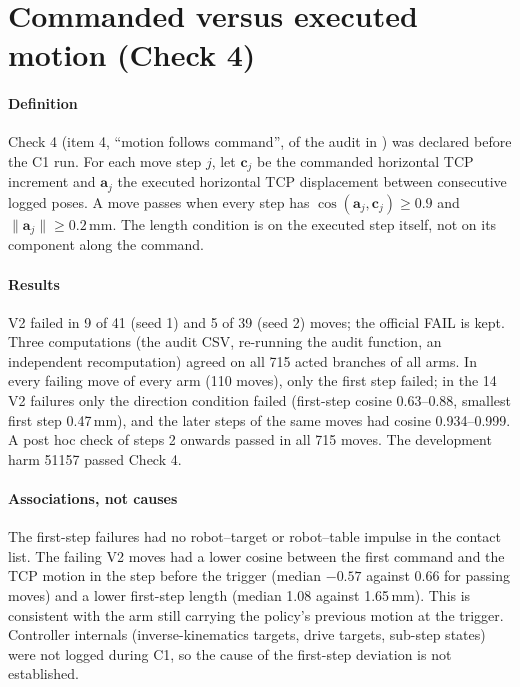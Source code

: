 \section{Commanded versus executed motion (Check 4)}\label{sec:s-check4}

\paragraph{Definition} Check 4 (item 4, ``motion follows command'', of the audit in ) was declared before the C1 run. For each move step $j$, let $\mathbf{c}_j$ be the commanded horizontal TCP increment and $\mathbf{a}_j$ the executed horizontal TCP displacement between consecutive logged poses. A move passes when every step has $\cos(\mathbf{a}_j,\mathbf{c}_j)\ge0.9$ and $\|\mathbf{a}_j\|\ge0.2$\,mm. The length condition is on the executed step itself, not on its component along the command.

\paragraph{Results} V2 failed in 9 of 41 (seed 1) and 5 of 39 (seed 2) moves; the official FAIL is kept. Three computations (the audit CSV, re-running the audit function, an independent recomputation) agreed on all 715 acted branches of all arms. In every failing move of every arm (110 moves), only the first step failed; in the 14 V2 failures only the direction condition failed (first-step cosine 0.63--0.88, smallest first step 0.47\,mm), and the later steps of the same moves had cosine 0.934--0.999. A post hoc check of steps 2 onwards passed in all 715 moves. The development harm 51157 passed Check 4.

\paragraph{Associations, not causes} The first-step failures had no robot--target or robot--table impulse in the contact list. The failing V2 moves had a lower cosine between the first command and the TCP motion in the step before the trigger (median $-0.57$ against $0.66$ for passing moves) and a lower first-step length (median 1.08 against 1.65\,mm). This is consistent with the arm still carrying the policy's previous motion at the trigger. Controller internals (inverse-kinematics targets, drive targets, sub-step states) were not logged during C1, so the cause of the first-step deviation is not established.
